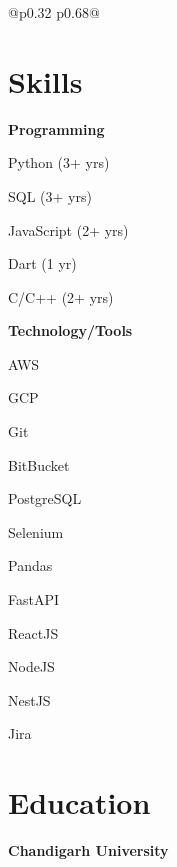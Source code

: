 \documentclass[a4paper,10pt]{article}
\begin{document}
\begin{tabularx}{\textwidth}{@{}p{0.32\textwidth} p{0.68\textwidth}@{}}


\begin{minipage}[t]{\linewidth}

\section*{Skills}

\textbf{Programming}

{\raggedright
\begin{skilllist}
\item Python (3+ yrs)
\item SQL (3+ yrs)
\item JavaScript (2+ yrs)
\item Dart (1 yr)
\item C/C++ (2+ yrs)
\end{skilllist}
\par}

\vspace{6pt}

\textbf{Technology/Tools}

{\raggedright
\begin{skilllist}
\item AWS
\item GCP
\item Git
\item BitBucket
\item PostgreSQL
\item Selenium
\item Pandas
\item FastAPI
\item ReactJS
\item NodeJS
\item NestJS
\item Jira
\end{skilllist}
\par}

\vspace{6pt}


\section*{Education}

\textbf{Chandigarh University}


\end{minipage}
\end{tabularx}
\end{document}
